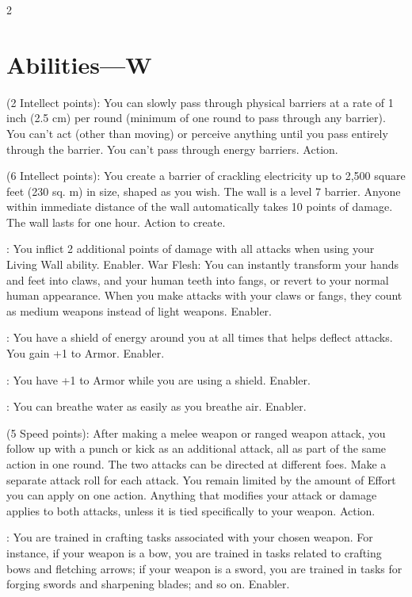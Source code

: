\begin{multicols}{2}

\section{Abilities—W}

 (2 Intellect points): You can slowly pass through physical barriers at a rate of 1 inch (2.5 cm) per round (minimum of one round to pass through any barrier). You can’t act (other than moving) or perceive anything until you pass entirely through the barrier. You can’t pass through energy barriers. Action. 
 
 (6 Intellect points): You create a barrier of crackling electricity up to 2,500 square feet (230 sq. m) in size, shaped as you wish. The wall is a level 7 barrier. Anyone within immediate distance of the wall automatically takes 10 points of damage. The wall lasts for one hour. Action to create. 
 
: You inflict 2 additional points of damage with all attacks when using your Living Wall ability. Enabler.
War Flesh: You can instantly transform your hands and feet into claws, and your human teeth into fangs, or revert to your normal human appearance. When you make attacks with your claws or fangs, they count as medium weapons instead of light weapons. Enabler.
 
: You have a shield of energy around you at all times that helps deflect attacks. You gain +1 to Armor. Enabler. 
 
: You have +1 to Armor while you are using a shield. Enabler. 
 
: You can breathe water as easily as you breathe air. Enabler. 
 
 (5 Speed points): After making a melee weapon or ranged weapon attack, you follow up with a punch or kick as an additional attack, all as part of the same action in one round. The two attacks can be directed at different foes. Make a separate attack roll for each attack. You remain limited by the amount of Effort you can apply on one action. Anything that modifies your attack or damage applies to both attacks, unless it is tied specifically to your weapon. Action. 
 
: You are trained in crafting tasks associated with your chosen weapon. For instance, if your weapon is a bow, you are trained in tasks related to crafting bows and fletching arrows; if your weapon is a sword, you are trained in tasks for forging swords and sharpening blades; and so on. Enabler.
 

\end{multicols}
